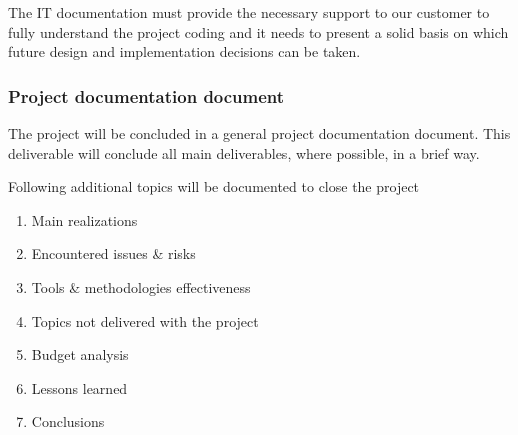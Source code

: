 The IT documentation must provide the necessary support to our customer to fully understand the project coding and it needs to present a solid basis on which future design and implementation decisions can be taken.

\subsubsection{Project documentation document}
The project will be concluded in a general project documentation document. This deliverable will conclude all main deliverables, where possible, in a brief way.

Following additional topics will be documented to close the project


 	\begin{enumerate}
		\item Main realizations
		\item Encountered issues \& risks
		\item Tools \& methodologies effectiveness
		\item Topics not delivered with the project
		\item Budget analysis
		\item Lessons learned
		\item Conclusions
	\end {enumerate}